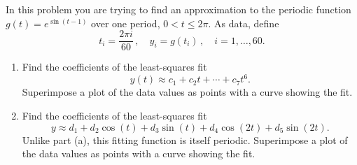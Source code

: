\begin{exercise}

	In this problem you are trying to find an approximation to the periodic
	function $g(t)=e^{\sin(t-1)}$ over one period, $0 < t \le 2\pi$. As data, define
	\[
		t_i = \frac{2\pi i}{60}\,,
		\quad
		y_i = g(t_i)\,,
		\quad i=1,\ldots,60.
	\]
	\begin{enumerate}[label=(\alph*)]
		\item Find the coefficients of the least-squares fit
		      \[
			      y(t) \approx c_1 + c_2t + \cdots + c_7 t^6.
		      \]
		      Superimpose a plot of the data values as points with a curve showing the
		      fit.

		\item Find the coefficients of the least-squares fit
		      \[
			      y \approx d_1 + d_2\cos(t) + d_3\sin(t) + d_4\cos(2t) + d_5\sin(2t).
		      \]
		      Unlike part (a), this fitting function is itself periodic. Superimpose a
		      plot of the data values as points with a curve showing the fit.
	\end{enumerate}

\end{exercise}


